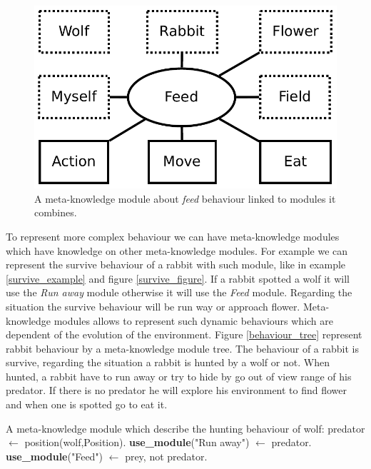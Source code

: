 \documentclass{aamas2012}
\begin{document}
	\begin{figure}
		\centering
		\includegraphics[keepaspectratio=true, scale=0.4]{feed.pdf}
		\caption
		{
			\label{feed_figure}
			A meta-knowledge module about \textit{feed} behaviour linked to modules it combines.
		}
	\end{figure}
	
	To represent more complex behaviour we can have meta-knowledge modules which have knowledge on other meta-knowledge modules.
	For example we can represent the survive behaviour of a rabbit with such module, like in example \ref{survive_example} and figure \ref{survive_figure}.
	If a rabbit spotted a wolf it will use the \emph{Run away} module otherwise it will use the \emph{Feed} module.
	Regarding the situation the survive behaviour will be run way or approach flower.
	Meta-knowledge modules allows to represent such dynamic behaviours which are dependent of the evolution of the environment.
	Figure \ref{behaviour_tree} represent rabbit behaviour by a meta-knowledge module tree.
	The behaviour of a rabbit is survive, regarding the situation a rabbit is hunted by a wolf or not.
	When hunted, a rabbit have to run away or try to hide by go out of view range of his predator.
	If there is no predator he will explore his environment to find flower and when one is spotted go to eat it.
	
	\begin{example}
		\label{survive_example}
		A meta-knowledge module which describe the hunting behaviour of wolf:\newline
		\newline
		predator $\leftarrow$ position(wolf,Position).\newline
		\textbf{use\_module}("Run away") $\leftarrow$ predator.\newline
		\textbf{use\_module}("Feed") $\leftarrow$ prey, not predator.\newline
	\end{example}
	
\end{document}
